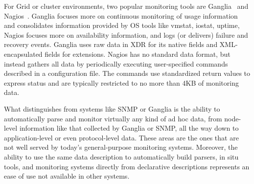 For Grid or cluster environments, two popular monitoring tools are
Ganglia~\cite{ganglia} and Nagios~\cite{nagios}.  Ganglia focuses more
on continuous monitoring of usage information and consolidates
information provided by OS tools like vmstat, iostat, uptime,
\etc{} Nagios focuses more on availability information, and logs (or
delivers) failure and recovery events. Ganglia uses raw data in XDR
for its native fields and XML-encapsulated fields for extensions.
Nagios has no standard data format, but instead gathers all data by
periodically executing user-specified commands described in a
configuration file. The commands use standardized return values to
express status and are typically restricted to no more than 4KB of
monitoring data.

What distinguishes \padsd{} from systems like SNMP or Ganglia is the
ability to automatically parse and monitor virtually any kind of
ad hoc data, from node-level information like that collected by
Ganglia or SNMP, all the way down to application-level or even
protocol-level data. These areas are the ones that are not well served
by today's general-purpose monitoring systems. Moreover, the ability
to use the same data description to automatically build parsers, 
in situ tools, and monitoring systems directly from declarative
descriptions represents an ease of use not
available in other systems. 



